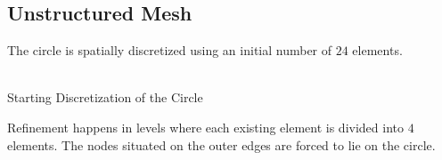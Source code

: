 \documentclass[a4paper,12pt]{article}
\makeatletter
\newenvironment{figurehere}
  {\def\@captype{figure}}
  {}
\makeatother
\begin{document}
\subsection{Unstructured Mesh}
The circle is spatially discretized using an initial number of $24$ elements. \begin{center}
\begin{figurehere}
\\
\caption{Starting Discretization of the Circle}\label{fig:initialmesh}
\end{figurehere}
\end{center}
Refinement happens in levels where each existing element is divided into $4$ elements. The nodes situated on the outer edges are forced to lie on the circle.
\end{document}
